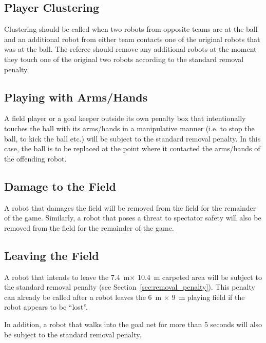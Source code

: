 \documentclass[12pt]{article}
\newcommand{\TotalWidth}{7.4~m\xspace}
\newcommand{\TotalLength}{10.4~m\xspace }
\begin{document}
\subsection{Player Clustering}
\label{sec:clustering}
Clustering should be called when two robots from opposite teams are at the ball and an additional robot from either team contacts one of the original robots that was at the ball.  The referee should remove any additional robots at the moment they touch one of the original two robots according to the standard removal penalty.

\subsection{Playing with Arms/Hands}
\label{sec:hand_ball}

A field player or a goal keeper outside its own penalty box that intentionally touches the ball with its arms/hands in a manipulative manner (i.e. to stop the ball, to kick the ball etc.) will be subject to the standard removal penalty. In this case, the ball is to be replaced at the point where it contacted the arms/hands of the offending robot.

\subsection{Damage to the Field}
\label{sec:damage}
A robot that damages the field will be removed from the field for the remainder of the game. Similarly, a robot that poses a threat to spectator safety will also be removed from the field for the remainder of the game.

\subsection{Leaving the Field}
\label{sec:leaving_field}

A robot that intends to leave the \TotalWidth $\times$ \TotalLength carpeted area will be subject to the standard removal penalty (see
Section~\ref{sec:removal_penalty}). This penalty can already be called after a robot leaves the 6~m $\times$ 9~m playing field if the robot appears to be ``lost''.

In addition, a robot that walks into the goal net for more than 5 seconds will also be subject to the standard removal penalty.
\end{document}
